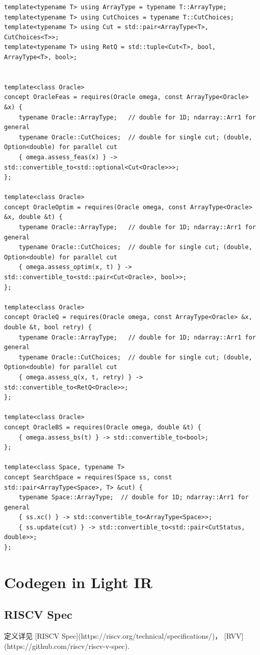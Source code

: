 \documentclass[a4paper]{exam}
\theoremstyle{definition}
\begin{document}
\begin{verbatim}
template<typename T> using ArrayType = typename T::ArrayType;
template<typename T> using CutChoices = typename T::CutChoices;
template<typename T> using Cut = std::pair<ArrayType<T>, CutChoices<T>>;
template<typename T> using RetQ = std::tuple<Cut<T>, bool, ArrayType<T>, bool>;


template<class Oracle>
concept OracleFeas = requires(Oracle omega, const ArrayType<Oracle> &x) {
    typename Oracle::ArrayType;   // double for 1D; ndarray::Arr1 for general
    typename Oracle::CutChoices;  // double for single cut; (double, Option<double) for parallel cut
    { omega.assess_feas(x) } -> std::convertible_to<std::optional<Cut<Oracle>>>;
};

template<class Oracle>
concept OracleOptim = requires(Oracle omega, const ArrayType<Oracle> &x, double &t) {
    typename Oracle::ArrayType;   // double for 1D; ndarray::Arr1 for general
    typename Oracle::CutChoices;  // double for single cut; (double, Option<double) for parallel cut
    { omega.assess_optim(x, t) } -> std::convertible_to<std::pair<Cut<Oracle>, bool>>;
};

template<class Oracle>
concept OracleQ = requires(Oracle omega, const ArrayType<Oracle> &x, double &t, bool retry) {
    typename Oracle::ArrayType;   // double for 1D; ndarray::Arr1 for general
    typename Oracle::CutChoices;  // double for single cut; (double, Option<double) for parallel cut
    { omega.assess_q(x, t, retry) } -> std::convertible_to<RetQ<Oracle>>;
};

template<class Oracle>
concept OracleBS = requires(Oracle omega, double &t) {
    { omega.assess_bs(t) } -> std::convertible_to<bool>;
};

template<class Space, typename T>
concept SearchSpace = requires(Space ss, const std::pair<ArrayType<Space>, T> &cut) {
    typename Space::ArrayType;  // double for 1D; ndarray::Arr1 for general
    { ss.xc() } -> std::convertible_to<ArrayType<Space>>;
    { ss.update(cut) } -> std::convertible_to<std::pair<CutStatus, double>>;
};
\end{verbatim}

\section{Codegen in Light IR}
\subsection{RISCV Spec}
定义详见 [RISCV Spec](https://riscv.org/technical/specifications/)， [RVV](https://github.com/riscv/riscv-v-spec).
\end{document}
